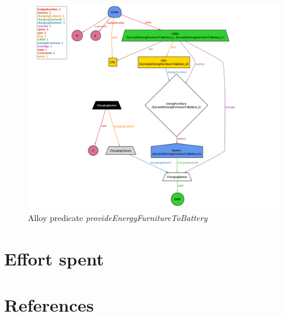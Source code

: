 \documentclass[a4paper]{report}
\begin{document}
\begin{landscape}
\begin{figure}[hp]
\includegraphics[angle=0, scale=0.6]{dynamicWorld}
\caption{Alloy predicate \textit{provideEnergyFurnitureToBattery}}
\label{fig:provideEnergy}
\end{figure}
\end{landscape}


\restoregeometry

\chapter{Effort spent}


\chapter{References}
\end{document}
